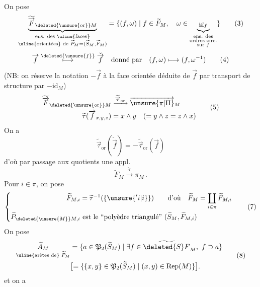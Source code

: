 On pose
\[
 \underbrace{\widetilde{\overrightarrow F}_{\deleted{\unsure{\mathrm{or}}}M}}_{\substack{\text{ens. des \uline{faces}}\\\text{\uline{orientées} de }\widetilde P_M=(\widetilde S_M,\widetilde F_M)}}
 =\{(f,\omega)\mid f\in\widetilde F_M,\quad
 \omega\in\underbrace{\underline\omega_f}_{\substack{\text{ens. des}\\\text{ordres circ.}\\\text{sur }f}}\}\tag*{(3)}
\]
\[
 \overrightarrow f\overset{\deleted{\unsure{f}}}{\longmapsto}\check{\overrightarrow f}\quad
 \text{donné par}\quad(f,\omega)\longmapsto(f,\omega^{-1})\tag*{(4)}
\]
(NB: on  réserve la notation $-\overrightarrow f$ à la face orientée déduite de $\overrightarrow f$ par transport de structure par $-\mathrm{id}_M$)
\[
 \begin{aligned}
 \widetilde{\overrightarrow F}_{\deleted{\unsure{\mathrm{or}}}M}&\xrightarrow{\widetilde{\overrightarrow\tau}_{\mathrm{or}}}\overrightarrow{\unsure{\pi|\Pi}}_M\\
 \widetilde\tau(\overrightarrow f_{x,y,z})&=x\wedge y\quad(=y\wedge z=z\wedge x)
 \end{aligned}\tag*{(5)}
\]
On a
\[
 \widetilde{\overrightarrow\tau}_{\mathrm{or}}(\check{\overrightarrow f})=
 -\widetilde{\overrightarrow\tau}_{\mathrm{or}}(\overrightarrow f)
\]
d'où par passage aux quotients une appl.
\[
 \widetilde F_M\xrightarrow{\widetilde\tau}\pi_M\,.\tag*{(6)}
\]
Pour $i\in\pi$, on pose
\[
 \left\{\begin{aligned}
 \widetilde F_{M,i}&=\widetilde\tau^{-1}(\{\unsure{{}'i|i}\})\qquad\text{d'où}\quad\widetilde F_M=\coprod_{i\in\pi}\widetilde F_{M,i}\\
 \widetilde P_{\deleted{\unsure{M}}M,i}&\text{ est le ``polyèdre triangulé'' }(\widetilde S_M,\widetilde F_{M,i})
 \end{aligned}\right.\tag*{(7)}
\]
 On pose
\[
 \begin{aligned}
 \underset{\text{\uline{arêtes de} }\widetilde P_M}{\widetilde A_M}
 &=\{a\in\mathfrak P_2(\widetilde S_M)\mid\exists f\in\widetilde{\deleted{S} F}_M,\ f\supset a\}\\
 &\bigl[=\{\{x,y\}\in\mathfrak P_2(\widetilde S_M)\mid(x,y)\in\operatorname{Rep}(M)\}\bigr].
 \end{aligned}\tag*{(8)}
\]
et on a
